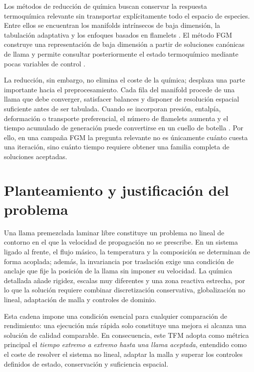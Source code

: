 \documentclass[12pt,a4paper,twoside,openany]{book}
\begin{document}
Los métodos de reducción de química buscan conservar la respuesta termoquímica
relevante sin transportar explícitamente todo el espacio de especies. Entre
ellos se encuentran los manifolds intrínsecos de baja dimensión, la tabulación
adaptativa y los enfoques basados en flamelets
\cite{MaasPope1992,Pope1997,Peters1984}. El método FGM construye una
representación de baja dimensión a partir de soluciones canónicas de llama y
permite consultar posteriormente el estado termoquímico mediante pocas
variables de control \cite{vanOijen2000,vanOijenReview2016}.

La reducción, sin embargo, no elimina el coste de la química; desplaza una parte
importante hacia el preprocesamiento. Cada fila del manifold procede de una
llama que debe converger, satisfacer balances y disponer de resolución espacial
suficiente antes de ser tabulada. Cuando se incorporan presión, entalpía,
deformación o transporte preferencial, el número de flamelets aumenta y el
tiempo acumulado de generación puede convertirse en un cuello de botella
\cite{DoniniThesis2014,vanOijenReview2016}. Por ello, en una campaña FGM la
pregunta relevante no es únicamente cuánto cuesta una iteración, sino cuánto
tiempo requiere obtener una familia completa de soluciones aceptadas.

\section{Planteamiento y justificación del problema}

Una llama premezclada laminar libre constituye un problema no lineal de contorno
en el que la velocidad de propagación no se prescribe. En un sistema ligado al
frente, el flujo másico, la temperatura y la composición se determinan de forma
acoplada; además, la invariancia por traslación exige una condición de anclaje
que fije la posición de la llama sin imponer su velocidad. La química detallada
añade rigidez, escalas muy diferentes y una zona reactiva estrecha, por lo que
la solución requiere combinar discretización conservativa, globalización no
lineal, adaptación de malla y controles de dominio.

Esta cadena impone una condición esencial para cualquier comparación de
rendimiento: una ejecución más rápida solo constituye una mejora si alcanza una
solución de calidad comparable. En consecuencia, este TFM adopta como métrica
principal el \emph{tiempo extremo a extremo hasta una llama aceptada}, entendido
como el coste de resolver el sistema no lineal, adaptar la malla y superar los
controles definidos de estado, conservación y suficiencia espacial.
\end{document}
